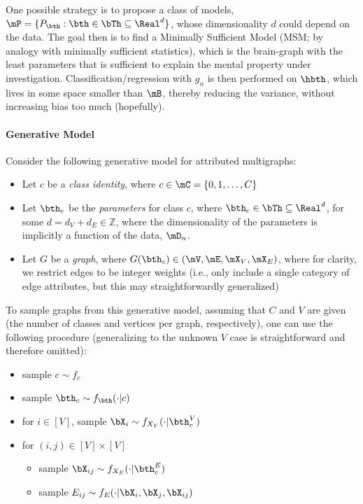 One possible strategy is to propose a class of models, $\mP=\{P_{\bth} : \bth \in \bTh \subseteq \Real^d\}$, whose dimensionality $d$ could depend on the data.  %
The goal then is to find a Minimally Sufficient Model (MSM; by analogy with minimally sufficient statistics), which is the brain-graph with the least parameters that is sufficient to explain the mental property under investigation.  %
Classification/regression with $g_n$ is then performed on $\hbth$, which lives in some space smaller than $\mB$, thereby reducing the variance, without increasing bias too much (hopefully).


\paragraph{Generative Model}

Consider the following generative model for attributed multigraphs:

\begin{itemize}
	\item Let $c$ be a \emph{class identity}, where $c \in \mC=\{0,1,\ldots, C\}$
	\item Let $\bth_c$ be the \emph{parameters} for class $c$, where $\bth_c \in \bTh \subseteq \Real^{d}$, for some $d=d_{V}+d_{E} \in \mathbb{Z}$, where the dimensionality of the parameters is implicitly a function of the data, $\mD_n$.
	\item Let $G$ be a \emph{graph}, where $G(\bth_c) \in (\mV, \mE, \mX_V, \mX_E)$, where for clarity, we restrict edges to be integer weights (i.e., only include a single category of edge attributes, but this may straightforwardly generalized)%
\end{itemize}

To sample graphs from this generative model, assuming that $C$ and $V$ are given (the number of classes and vertices per graph, respectively), one can use the following procedure (generalizing to the unknown $V$ case is straightforward and therefore omitted):

\begin{itemize}
	\item sample $c \sim f_c$
	\item sample $\bth_c \sim f_{\bth}(\cdot | c)$
	\item for $i \in [V]$, sample $\bX_i \sim f_{X_V}(\cdot | \bth_c^V)$
	\item for $(i,j) \in [V] \times [V]$
	\begin{itemize}
		\item sample $\bX_{ij} \sim f_{X_E}(\cdot | \bth_c^E)$
		\item  sample $E_{ij} \sim f_E(\cdot | \bX_i, \bX_j, \bX_{ij})$
	\end{itemize}
\end{itemize}

